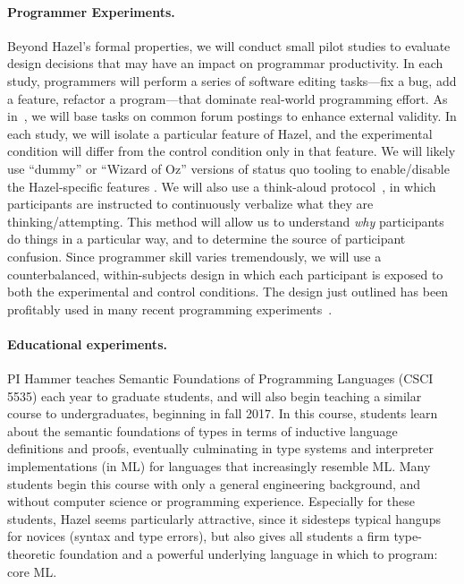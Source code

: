 \documentclass{purple}
\newcommand{\Hazel}[0]{\textsf{Hazel}\xspace}
\newcommand{\HazelEnv}[0]{\Hazel\xspace}
\begin{document}
\paragraph{Programmer Experiments.} 
%
Beyond \Hazel's formal properties, we will conduct small pilot studies to
evaluate design decisions that may have an impact on programmar productivity. 
%
In each study, programmers will perform a series of software editing 
tasks---fix a bug, add a feature, refactor a program---that dominate 
real-world programming effort. As in~\cite{sunshine14plaiddoc}, 
we will base tasks on common forum postings to enhance external validity. In 
each study, we will isolate a particular feature of \Hazel, and the experimental 
condition will differ from the control condition only in that feature. We will 
likely use ``dummy'' or ``Wizard of Oz''  versions of status quo tooling to 
enable/disable the \HazelEnv-specific features \cite{wizard-of-oz}. We will also use 
a think-aloud protocol~\cite{think-aloud-protocol}, in which participants are 
instructed to continuously verbalize what they are thinking/attempting. This 
method will allow us to understand \textit{why} participants do things in a 
particular way, and to determine the source of participant confusion. Since 
programmer skill varies tremendously, we will use a counterbalanced, 
within-subjects design in which each participant is exposed to both the 
experimental and control conditions. 
The design just outlined has been profitably used in many recent programming 
experiments~\cite{stylos-constructor-params, static-typing-apidoc, benefits-generic-types}.



\paragraph{Educational experiments.} 
%
PI Hammer teaches Semantic Foundations of Programming Languages (CSCI
5535) each year to graduate students, and will also begin teaching a
similar course to undergraduates, beginning in fall 2017.
%
In this course, students learn about the semantic foundations of types
in terms of inductive language definitions and proofs, eventually
culminating in type systems and interpreter implementations (in ML)
for languages that increasingly resemble ML.
%
Many students begin this course with only a general engineering
background, and without computer science or programming experience.
Especially for these students, \Hazel seems particularly attractive,
since it sidesteps typical hangups for novices (syntax and type
errors), but also gives all students a firm type-theoretic foundation
and a powerful underlying language in which to program: core ML.
\end{document}
